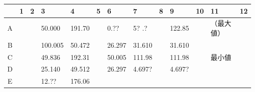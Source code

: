 \documentclass[UTF8,10pt,a4paper,fontset=fandol]{ctexart}
\newcommand{\fieldvalue}[1]{#1}
\begin{document}
\begin{center}
\scriptsize
\begin{tabular}{c|p{0.52cm}|p{0.52cm}|p{1.02cm}|p{1.02cm}|p{0.52cm}|p{1.02cm}|p{1.02cm}|p{0.52cm}|p{1.02cm}|p{0.52cm}|p{1.02cm}|p{0.52cm}}
 & 1 & 2 & 3 & 4 & 5 & 6 & 7 & 8 & 9 & 10 & 11 & 12\\ \hline
A & & &
\fieldvalue{\scriptsize 50.000} &
\fieldvalue{\scriptsize 191.70} &
&
\fieldvalue{\scriptsize 0.??} &
\fieldvalue{\scriptsize 5? .?} &
&
\fieldvalue{\scriptsize 122.85} &
& （最大値） &\\ \hline
B & & &
\fieldvalue{\scriptsize 100.005} &
\fieldvalue{\scriptsize 50.472} &
&
\fieldvalue{\scriptsize 26.297} &
\fieldvalue{\scriptsize 31.610} &
&
\fieldvalue{\scriptsize 31.610} &
& &\\ \hline
C & & &
\fieldvalue{\scriptsize 49.836} &
\fieldvalue{\scriptsize 192.31} &
&
\fieldvalue{\scriptsize 50.005} &
\fieldvalue{\scriptsize 111.98} &
&
\fieldvalue{\scriptsize 111.98} &
& 最小値 &\\ \hline
D & & &
\fieldvalue{\scriptsize 25.140} &
\fieldvalue{\scriptsize 49.512} &
&
\fieldvalue{\scriptsize 26.297} &
\fieldvalue{\scriptsize 4.697?} &
&
\fieldvalue{\scriptsize 4.697?} &
& &\\ \hline
E & & &
\fieldvalue{\scriptsize 12.??} &
\fieldvalue{\scriptsize 176.06} &
&

\end{tabular}
\end{center}
\end{document}
